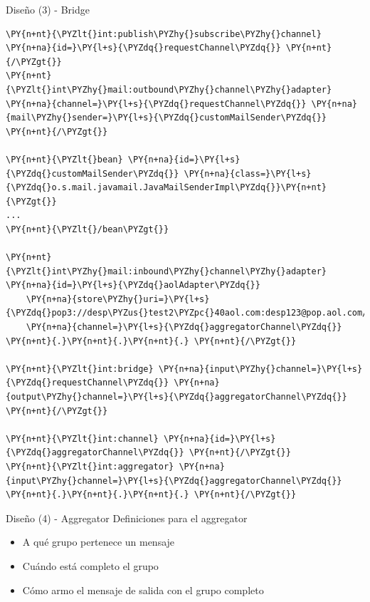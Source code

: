 \documentclass{beamer}
\begin{document}
\begin{frame}[fragile]{Diseño (3) - Bridge}
\begin{Verbatim}[fontsize=\tiny,commandchars=\\\{\}]
\PY{n+nt}{\PYZlt{}int:publish\PYZhy{}subscribe\PYZhy{}channel} \PY{n+na}{id=}\PY{l+s}{\PYZdq{}requestChannel\PYZdq{}} \PY{n+nt}{/\PYZgt{}}
\PY{n+nt}{\PYZlt{}int\PYZhy{}mail:outbound\PYZhy{}channel\PYZhy{}adapter} \PY{n+na}{channel=}\PY{l+s}{\PYZdq{}requestChannel\PYZdq{}} \PY{n+na}{mail\PYZhy{}sender=}\PY{l+s}{\PYZdq{}customMailSender\PYZdq{}} \PY{n+nt}{/\PYZgt{}}

\PY{n+nt}{\PYZlt{}bean} \PY{n+na}{id=}\PY{l+s}{\PYZdq{}customMailSender\PYZdq{}} \PY{n+na}{class=}\PY{l+s}{\PYZdq{}o.s.mail.javamail.JavaMailSenderImpl\PYZdq{}}\PY{n+nt}{\PYZgt{}}
...
\PY{n+nt}{\PYZlt{}/bean\PYZgt{}} 

\PY{n+nt}{\PYZlt{}int\PYZhy{}mail:inbound\PYZhy{}channel\PYZhy{}adapter} \PY{n+na}{id=}\PY{l+s}{\PYZdq{}aolAdapter\PYZdq{}}
    \PY{n+na}{store\PYZhy{}uri=}\PY{l+s}{\PYZdq{}pop3://desp\PYZus{}test2\PYZpc{}40aol.com:desp123@pop.aol.com/INBOX\PYZdq{}}
    \PY{n+na}{channel=}\PY{l+s}{\PYZdq{}aggregatorChannel\PYZdq{}} \PY{n+nt}{.}\PY{n+nt}{.}\PY{n+nt}{.} \PY{n+nt}{/\PYZgt{}}

\PY{n+nt}{\PYZlt{}int:bridge} \PY{n+na}{input\PYZhy{}channel=}\PY{l+s}{\PYZdq{}requestChannel\PYZdq{}} \PY{n+na}{output\PYZhy{}channel=}\PY{l+s}{\PYZdq{}aggregatorChannel\PYZdq{}} \PY{n+nt}{/\PYZgt{}}

\PY{n+nt}{\PYZlt{}int:channel} \PY{n+na}{id=}\PY{l+s}{\PYZdq{}aggregatorChannel\PYZdq{}} \PY{n+nt}{/\PYZgt{}}
\PY{n+nt}{\PYZlt{}int:aggregator} \PY{n+na}{input\PYZhy{}channel=}\PY{l+s}{\PYZdq{}aggregatorChannel\PYZdq{}} \PY{n+nt}{.}\PY{n+nt}{.}\PY{n+nt}{.} \PY{n+nt}{/\PYZgt{}}
\end{Verbatim}

\end{frame}

\begin{frame}{Diseño (4) - Aggregator}
Definiciones para el aggregator
\begin{itemize}[<+->]
\item A qué grupo pertenece un mensaje
\item Cuándo está completo el grupo
\item Cómo armo el mensaje de salida con el grupo completo
\end{itemize}
\end{frame}
\end{document}
